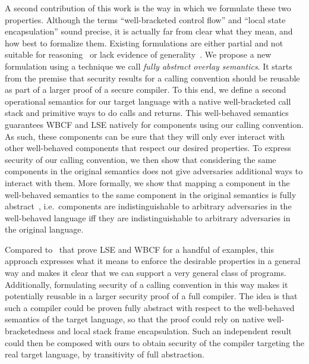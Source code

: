 \documentclass{jfp}
\begin{document}
A second contribution of this work is the way in which we formulate these two properties.
Although the terms ``well-bracketed control flow'' and ``local state encapsulation'' sound precise, it is actually far from clear what they mean, and how best to formalize them.
Existing formulations are either partial and not suitable for reasoning~\cite{abadi_control-flow_2005} or lack evidence of generality~\cite{skorstengaard_reasoning_2017}.
We propose a new formulation using a technique we call {\itshape fully abstract overlay semantics}.
It starts from the premise that security results for a calling convention should be reusable as part of a larger proof of a secure compiler.
To this end, we define a second operational semantics for our target language with a native well-bracketed call stack and primitive ways to do calls and returns.
This well-behaved semantics guarantees WBCF and LSE natively for components using our calling convention.
As such, these components can be sure that they will only ever interact with other well-behaved components that respect our desired properties.
To express security of our calling convention, we then show that considering the same components in the original semantics does not give adversaries additional ways to interact with them. 
More formally, we show that mapping a component in the well-behaved semantics to the same component in the original semantics is fully abstract~\cite{abadi_protection_1999}, i.e.\ components are indistinguishable to arbitrary adversaries in the well-behaved language iff they are indistinguishable to arbitrary adversaries in the original language.

Compared to~\citet{skorstengaard_reasoning_2017} that prove LSE and WBCF for a handful of examples,
this approach expresses what it means to enforce the desirable properties in a general way and makes it clear that we can support a very general class of programs.
Additionally, formulating security of a calling convention in this way makes it potentially reusable in a larger security proof of a full compiler.
The idea is that such a compiler could be proven fully abstract with respect to the well-behaved semantics of the target language, so that the proof could rely on native well-bracketedness and local stack frame encapsulation.
Such an independent result could then be composed with ours to obtain security of the compiler targeting the real target language, by transitivity of full abstraction.
\end{document}

